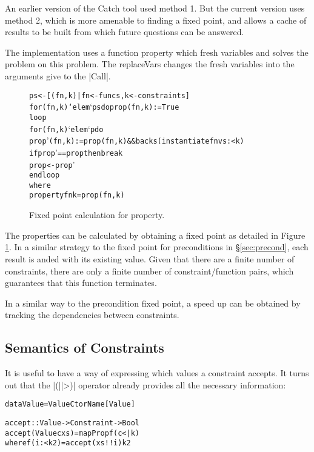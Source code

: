 \documentclass[preprint]{sigplanconf}
\newcommand{\C}[1]{\textsf{#1}}
\newenvironment{code}{\begin{alltt}\small}{\end{alltt}}
\begin{document}
\begin{description}
    An earlier version of the Catch tool \citep{me:catch_tfp} used method 1. But the current version uses method 2, which is more amenable to finding a fixed point, and allows a cache of results to be built from which future questions can be answered.
    
    The implementation uses a function \C{property} which fresh variables and solves the problem on this problem. The \C{replaceVars} changes the fresh variables into the arguments give to the |Call|.

    \begin{figure}
    \begin{code}
    ps <- [(fn,k) | fn <- funcs, k <- constraints]
    for (fn,k) `elem` ps do prop(fn,k) := True
    loop
        for (fn,k) `elem` p do
            prop'(fn,k) := prop(fn,k) && backs (instantiate fn vs :< k)
        if prop' == prop then break
        prop <- prop'
    end loop
        where
            property fn k = prop(fn,k)
    \end{code}
    \caption{Fixed point calculation for \C{property}.}
    \label{fig:property_fixp}
    \end{figure}
        
    The properties can be calculated by obtaining a fixed point as detailed in Figure \ref{fig:property_fixp}. In a similar strategy to the fixed point for preconditions in \S\ref{sec:precond}, each result is anded with its existing value. Given that there are a finite number of constraints, there are only a finite number of constraint/function pairs, which guarantees that this function terminates.
    
    In a similar way to the precondition fixed point, a speed up can be obtained by tracking the dependencies between constraints.
\end{description}

\subsection{Semantics of Constraints}

It is useful to have a way of expressing which values a constraint accepts. It turns out that the |(||>)| operator already provides all the necessary information:

\begin{code}
data Value = Value CtorName [Value]

accept :: Value -> Constraint -> Bool
accept (Value c xs) = mapProp f (c <| k)
    where f (i :< k2) = accept (xs !! i) k2
\end{code}
\end{document}
